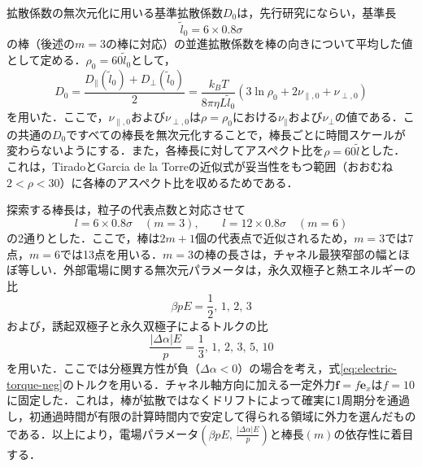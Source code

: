 \documentclass[dvipdfmx]{ampbt}
\begin{document}
  拡散係数の無次元化に用いる基準拡散係数$D_0$は，先行研究\cite{yang2019}にならい，基準長
  \begin{equation}
    \tilde{l}_0=6\times0.8\sigma
  \end{equation}
  の棒（後述の$m=3$の棒に対応）の並進拡散係数を棒の向きについて平均した値として定める．$\rho_0=60\tilde{l}_0$として，
  \begin{equation}
    D_0
    = \frac{D_{\parallel}(\tilde{l}_0) + D_{\perp}(\tilde{l}_0)}{2}
    =\frac{k_BT}{8\pi\eta L\tilde{l}_0}
    \left(
    3\ln \rho_0+2\nu_{\parallel,0}+\nu_{\perp,0}
    \right)
  \end{equation}
  を用いた．ここで，$\nu_{\parallel,0}$および$\nu_{\perp,0}$は$\rho=\rho_0$における$\nu_{\parallel}$および$\nu_{\perp}$の値である．この共通の$D_0$ですべての棒長を無次元化することで，棒長ごとに時間スケールが変わらないようにする．また，各棒長に対してアスペクト比を$\rho=60\tilde{l}$とした．これは，TiradoとGarcia de la Torreの近似式が妥当性をもつ範囲（おおむね$2<\rho<30$）に各棒のアスペクト比を収めるためである．

  探索する棒長は，粒子の代表点数と対応させて
  \begin{equation}
    l=6\times0.8\sigma\quad(m=3),\qquad
    l=12\times0.8\sigma\quad(m=6)
  \end{equation}
  の2通りとした．ここで，棒は$2m+1$個の代表点で近似されるため，$m=3$では7点，$m=6$では13点を用いる．$m=3$の棒の長さは，チャネル最狭窄部の幅とほぼ等しい．外部電場に関する無次元パラメータは，永久双極子と熱エネルギーの比
  \begin{equation}
    \beta pE
    =
    \frac12,\,1,\,2,\,3
  \end{equation}
  および，誘起双極子と永久双極子によるトルクの比
  \begin{equation}
    \frac{|\Delta\alpha|E}{p}
    =
    \frac13,\,1,\,2,\,3,\,5,\,10
  \end{equation}
  を用いた．ここでは分極異方性が負（$\Delta\alpha<0$）の場合を考え，式\eqref{eq:electric-torque-neg}のトルクを用いる．チャネル軸方向に加える一定外力$\bm{f}=f\bm{e}_x$は$f=10$に固定した．これは，棒が拡散ではなくドリフトによって確実に1周期分を通過し，初通過時間が有限の計算時間内で安定して得られる領域に外力を選んだものである．以上により，電場パラメータ$(\beta pE,\,\frac{|\Delta\alpha|E}{p})$と棒長$(m)$の依存性に着目する．
\end{document}
